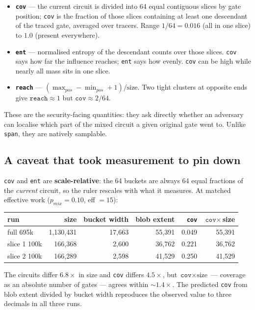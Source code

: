 \documentclass[11pt]{article}
\begin{document}
\begin{itemize}
\item \textbf{\texttt{cov}} --- the current circuit is divided into 64 equal
contiguous slices by gate position; \texttt{cov} is the fraction of those slices
containing at least one descendant of the traced gate, averaged over tracers.
Range $1/64=0.016$ (all in one slice) to $1.0$ (present everywhere).
\item \textbf{\texttt{ent}} --- normalised entropy of the descendant counts over
those slices. \texttt{cov} says how far the influence reaches; \texttt{ent} says
how evenly. \texttt{cov} can be high while nearly all mass sits in one slice.
\item \textbf{\texttt{reach}} --- $(\max_{pos}-\min_{pos}+1)/\text{size}$. Two
tight clusters at opposite ends give $\texttt{reach}\approx 1$ but
$\texttt{cov}\approx 2/64$.
\end{itemize}

These are the security-facing quantities: they ask directly whether an adversary
can localise which part of the mixed circuit a given original gate went to.
Unlike \texttt{span}, they are natively samplable.

\subsection{A caveat that took measurement to pin down}

\texttt{cov} and \texttt{ent} are \textbf{scale-relative}: the 64 buckets are
always 64 equal fractions of the \emph{current} circuit, so the ruler rescales
with what it measures. At matched effective work ($p_{mix}=0.10$, eff $=15$):

\begin{center}
\begin{tabular}{lrrrrr}
\toprule
run & size & bucket width & blob extent & \texttt{cov} & $\texttt{cov}\times$size \\
\midrule
full 695k    & 1{,}130{,}431 & 17{,}663 & 55{,}391 & 0.049 & 55{,}391 \\
slice 1 100k &   166{,}368   &  2{,}600 & 36{,}762 & 0.221 & 36{,}762 \\
slice 2 100k &   166{,}289   &  2{,}598 & 41{,}529 & 0.250 & 41{,}529 \\
\bottomrule
\end{tabular}
\end{center}

The circuits differ $6.8\times$ in size and \texttt{cov} differs $4.5\times$, but
$\texttt{cov}\times\text{size}$ --- coverage as an absolute number of gates ---
agrees within $\sim\!1.4\times$. The predicted \texttt{cov} from blob extent
divided by bucket width reproduces the observed value to three decimals in all
three runs.
\end{document}
